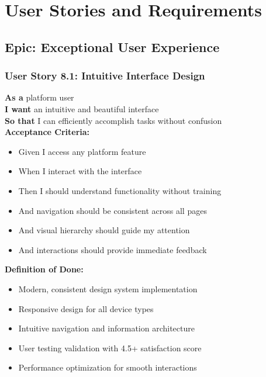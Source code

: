 \section{User Stories and Requirements}

\subsection{Epic: Exceptional User Experience}

\subsubsection{User Story 8.1: Intuitive Interface Design}

\begin{tcolorbox}[colback=lightgray, colframe=primaryblue, title=US-8.1: Intuitive Interface Design]
\textbf{As a} platform user \\
\textbf{I want} an intuitive and beautiful interface \\
\textbf{So that} I can efficiently accomplish tasks without confusion \\

\textbf{Acceptance Criteria:}
\begin{itemize}
    \item Given I access any platform feature
    \item When I interact with the interface
    \item Then I should understand functionality without training
    \item And navigation should be consistent across all pages
    \item And visual hierarchy should guide my attention
    \item And interactions should provide immediate feedback
\end{itemize}

\textbf{Definition of Done:}
\begin{itemize}
    \item Modern, consistent design system implementation
    \item Responsive design for all device types
    \item Intuitive navigation and information architecture
    \item User testing validation with 4.5+ satisfaction score
    \item Performance optimization for smooth interactions
\end{itemize}
\end{tcolorbox}

